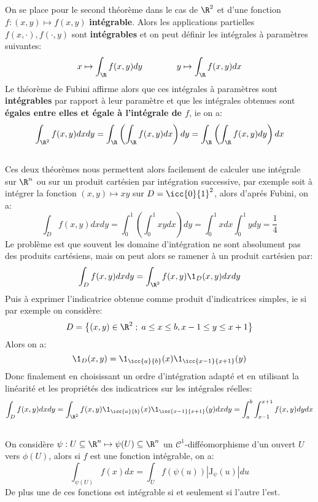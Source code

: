 \subsection*{}
On se place pour le second théorème dans le cas de \( \R^2 \) et d'une fonction \( f : (x, y) \mapsto f(x, y) \) \textbf{intégrable}.
Alors les applications partielles \( f(x, \cdot), f( \cdot, y) \) sont \textbf{intégrables} et on peut définir les intégrales à paramètres suivantes:
\[ 
   x \mapsto \int_\R f(x, y)dy \quad\quad\quad\quad y \mapsto \int_\R f(x, y)dx
\]
Le théorème de Fubini affirme alors que ces intégrales à paramètres sont \textbf{intégrables} par rapport à leur paramètre et que les intégrales obtenues sont \textbf{égales entre elles et égale à l'intégrale de \( f \)}, ie on a:
\[ 
   \int_{\R^2} f(x, y) dxdy = \int_\R \left( \int_\R f(x, y)dx  \right)dy = \int_\R \left( \int_\R f(x, y)dy  \right)dx
\]

\subsection*{}
Ces deux théorèmes nous permettent alors facilement de calculer une intégrale sur \( \R^n \) ou sur un produit cartésien par intégration successive, par exemple soit à intégrer la fonction \( (x, y) \mapsto xy \) sur \( D = \icc{0}{1}^2 \), alors d'aprés Fubini, on a:
\[ 
   \int_D f(x, y)dxdy = \int_0^1 \left( \int_0^1 xydx \right) dy = \int_0^1 xdx \int_0^1ydy = \frac{1}{4}
\] 
Le problème est que souvent les domaine d'intégration ne sont absolument pas des produits cartésiens, mais on peut alors se ramener à un produit cartésien par:
\[ 
   \int_D f(x, y)dxdy = \int_{\R^2} f(x, y)\1_D(x, y)dxdy 
\]
Puis à exprimer l'indicatrice obtenue comme produit d'indicatrices simples, ie si par exemple on considère:
\[ 
   D = \left\{ (x,y) \in \R^2 \; ; \; a \leq x \leq b , x-1 \leq y \leq x + 1 \right\}
\]
Alors on a:
\[ 
   \1_D(x, y) = \1_{\icc{a}{b}}(x)\1_{\icc{x-1}{x+1}}(y)
\]
Donc finalement en choisissant un ordre d'intégration adapté et en utilisant la linéarité et les propriétés des indicatrices sur les intégrales réelles:
\[ 
   \int_D f(x, y)dxdy = \int_{\R^2} f(x, y)\1_{\icc{a}{b}}(x)\1_{\icc{x-1}{x+1}}(y)dxdy = \int_{a}^b \int_{x-1}^{x+1} f(x, y)dydx
\]
\pagebreak

\subsection*{}
On considère \( \psi : U \subseteq \R^n \mapsto \psi(U) \subseteq \R^n\) un \( \mathcal{C}^1 \)-difféomorphisme d'un ouvert \( U \) vers \( \phi(U) \), alors si \( f \) est une fonction intégrable, on a:
\[ 
   \int_{\psi(U)} f(x) dx = \int_U f(\psi(u)) |\text{J}_\psi(u)| du
\]
De plus une de ces fonctions est intégrable si et seulement si l'autre l'est. 

